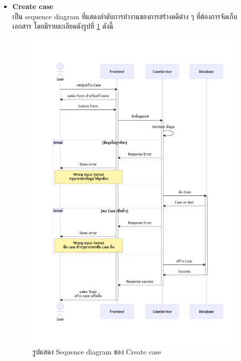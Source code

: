 \documentclass[12pt,oneside,openright,a4paper]{cpe-thai-project}
\begin{document}
\begin{itemize}

    \item \textbf{Create case}\\
    เป็น sequence diagram ที่แสดงลำดับการทำงานของการสร้างคดีต่าง ๆ ที่ต้องการจัดเก็บเอกสาร โดยมีรายละเอียดดังรูปที่ \ref{fig:sqCreateCase} ดังนี้
    \begin{figure}[!ht]\centering
        \includegraphics[width=15cm, trim={0 3cm 0 3cm},clip]{./assets/sequence-diagram/create-case.png}
        \caption{รูปแสดง Sequence diagram ของ Create case}\label{fig:sqCreateCase}
    \end{figure}


\end{itemize}
\end{document}
